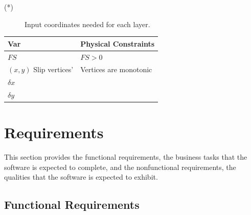 \documentclass[12pt]{article}
\renewcommand{\arraystretch}{1}
\begin{document}
\noindent \begin{description}
\item[(*)] Input coordinates needed for each layer.
\end{description}

\renewcommand{\arraystretch}{1.2} 
\noindent \begin{longtable}{l l} 
  \toprule \label{TblOutputVar}
  \textbf{Var} & \textbf{Physical Constraints} \\
  \midrule 
  $FS$ & $FS>0$ \\
  $(x,y)$ Slip vertices' &  Vertices are monotonic \\
  $\delta x$ &  \\
  $\delta y$ &  \\
  \bottomrule
\end{longtable}

\section{Requirements}

This section provides the functional requirements, the business tasks
that the software is expected to complete, and the nonfunctional
requirements, the qualities that the software is expected to exhibit.

\subsection{Functional Requirements}
\end{document}
